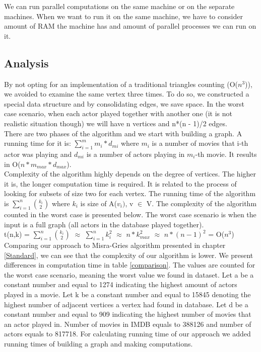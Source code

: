 We can run parallel computations on the same machine or on the separate machines. When we want to run it on the same machine, we have to consider amount of RAM the machine has and amount of parallel processes we can run on it.

\subsection{Analysis}
By not opting for an implementation of a traditional triangles counting (O(\(n^3\))), we avoided to examine the same vertex three times. To do so, we constructed a special data structure and by consolidating edges, we save space.
In the worst case scenario, when each actor played together with another one (it is not realistic situation though) we will have n vertices and n*(n - 1)/2 edges.
\\
There are two phases of the algorithm and we start with building a graph. A running time for it is: \(\sum\limits_{i=1}^m{m_i * d_{mi}}\) where \(m_i\) is a number of movies that i-th actor was playing and \(d_{mi}\) is a number of actors playing in \(m_i\)-th movie. It results in O(\(n*m_{max}*d_{max}\)).
\\
Complexity of the algorithm highly depends on the degree of vertices. The higher it is, the longer computation time is required. It is related to the process of looking for subsets of size two for each vertex. The running time of the algorithm is \(\sum\limits_{i=1}^n{k_i \choose 2}\) where \(k_i\) is size of A(\(v_i)\), v \(\in\) V. The complexity of the algorithm counted in the worst case is presented below. The worst case scenario is when the input is a full graph (all actors in the database played together).
\\
t(n,k) = \(\sum\limits_{i=1}^n{k_i \choose 2}\) \(\approx\) \(\sum\limits_{i=1}^n{k_i^2}\) \(\approx\) \(n*k_{max}^2\) \(\approx\) \(n*(n-1)^2\) = O(\(n^3\))
\\
Comparing our approach to Misra-Gries algorithm presented in chapter \ref{Standard}, we can see that the complexity of our algorithm is lower. We present differences in computation time in table \ref{comparison}. The values are counted for the worst case scenario, meaning the worst value we found in dataset. Let a be a constant number and equal to 1274 indicating the highest amount of actors played in a movie. Let k be a constant number and equal to 15845 denoting the highest number of adjacent vertices a vertex had found in database. Let d be a constant number and equal to 909 indicating the highest number of movies that an actor played in. Number of movies in IMDB equals to 388126 and number of actors equals to 817718. For calculating running time of our approach we added running times of building a graph and making computations.
